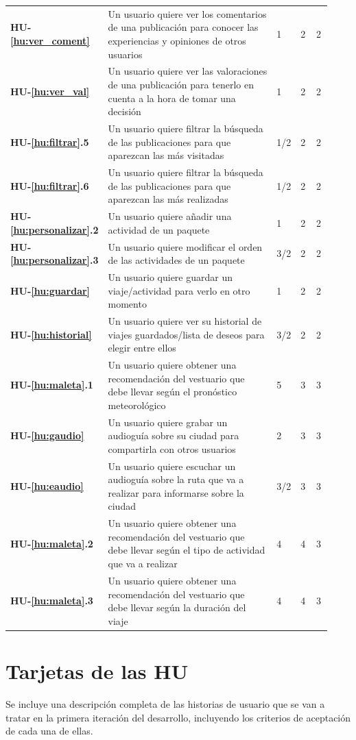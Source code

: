 \documentclass[11pt]{article}
\begin{document}
\begin{longtable}{p{0.13\linewidth}p{0.65\linewidth}p{0.05\linewidth}p{0.05\linewidth}p{0.05\linewidth}}
	\textbf{HU-\ref{hu:ver_coment}} & Un usuario quiere ver los comentarios de una publicación para conocer las experiencias y opiniones de otros usuarios & 1 & 2 & 2\\
	\textbf{HU-\ref{hu:ver_val}} & Un usuario quiere ver las valoraciones de una publicación para tenerlo en cuenta a la hora de tomar una decisión & 1 & 2 & 2\\  
	\textbf{HU-\ref{hu:filtrar}.5} & Un usuario quiere filtrar la búsqueda de las publicaciones para que aparezcan las más visitadas & 1/2 & 2 & 2\\ 
	\textbf{HU-\ref{hu:filtrar}.6} & Un usuario quiere filtrar la búsqueda de las publicaciones para que aparezcan las más realizadas & 1/2 & 2 & 2\\
	\textbf{HU-\ref{hu:personalizar}.2} & Un usuario quiere añadir una actividad de un paquete & 1 & 2 & 2 \\ 
	\textbf{HU-\ref{hu:personalizar}.3} & Un usuario quiere modificar el orden de las actividades de un paquete & 3/2 & 2 & 2 \\
	\textbf{HU-\ref{hu:guardar}} & Un usuario quiere guardar un viaje/actividad para verlo en otro momento & 1 & 2 & 2\\ 
	\textbf{HU-\ref{hu:historial}} & Un usuario quiere ver su historial de viajes guardados/lista de deseos para elegir entre ellos & 3/2 & 2 & 2\\
	\textbf{HU-\ref{hu:maleta}.1} & Un usuario quiere obtener una recomendación del vestuario que debe llevar según el pronóstico meteorológico & 5 & 3 & 3\\
	\textbf{HU-\ref{hu:gaudio}} & Un usuario quiere grabar un audioguía sobre su ciudad para compartirla con otros usuarios & 2 & 3 & 3\\
	\textbf{HU-\ref{hu:eaudio}} & Un usuario quiere escuchar un audioguía sobre la ruta que va a realizar para informarse sobre la ciudad & 3/2 & 3 & 3\\
	\textbf{HU-\ref{hu:maleta}.2} & Un usuario quiere obtener una recomendación del vestuario que debe llevar según el tipo de actividad que va a realizar & 4 & 4 & 3\\
	\textbf{HU-\ref{hu:maleta}.3} & Un usuario quiere obtener una recomendación del vestuario que debe llevar según la duración del viaje & 4 & 4 & 3\\
	\bottomrule
\end{longtable}


\section{Tarjetas de las HU}
Se incluye una descripción completa de las historias de usuario que se van a tratar en la primera iteración del desarrollo, incluyendo los criterios de aceptación de cada una de ellas.
\end{document}
